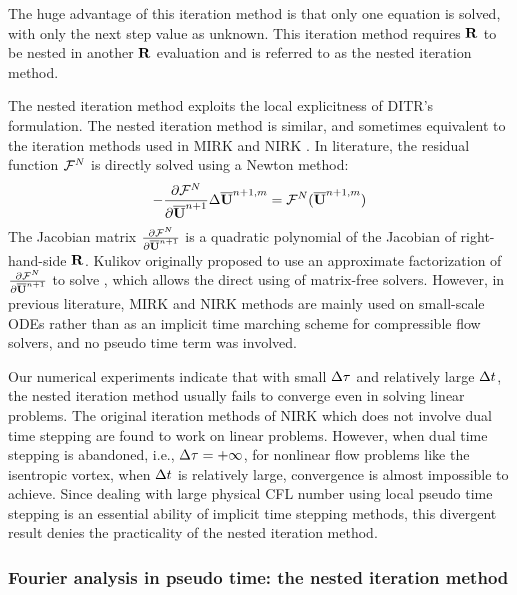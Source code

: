 The huge advantage of this iteration method is that only one equation is solved,
with only the next step value as unknown.
This iteration method requires $\mathbf{R}$ to be nested in another $\mathbf{R}$ evaluation and
is referred to as the nested iteration method.

The nested iteration method exploits the
local explicitness of DITR's formulation.
The nested iteration method is similar, and sometimes equivalent to
the iteration methods used in MIRK \cite{cash1975classMIRKOrig,cash1977clasMIRK1,cash1982monoMIRK2}
and NIRK \cite{kulikov2006familyNIRKOrig,kulikov2009adaptive,kulikov2007asymptotic}.
In literature, the residual function $\mathcal{F}^N$ is directly
solved using a Newton method:
\begin{equation}
    -\partialderivative{\FF^N}{\uu^{n+1}}
    \inc\uu^{n+1,m} = \FF^N(\uu^{n+1,m})
    \label{eq:abstractNewtonNestedNoTau}
\end{equation}
The Jacobian matrix $\partialderivative{\FF^N}{\uu^{n+1}}$
is a quadratic polynomial of the Jacobian of right-hand-side $\mathbf{R}$.
Kulikov originally proposed to use an approximate factorization \cite{kulikov2006familyNIRKOrig}
of $\partialderivative{\FF^N}{\uu^{n+1}}$ to solve ,
which allows the direct using of matrix-free solvers.
However, in previous literature, MIRK and NIRK methods are mainly used on small-scale
ODEs rather than as an implicit time marching scheme for compressible flow solvers,
and no pseudo time term was involved.

Our numerical experiments indicate that with small ${\Delta}\tau$
and relatively large ${\Delta} t$,
the nested iteration method 
usually fails to converge even in solving linear problems.
The original iteration methods of NIRK 
which does not involve dual time stepping
are found to work on linear problems.
However,  when dual time stepping is abandoned, i.e., ${\Delta} \tau=+\infty$,
for nonlinear flow problems like the isentropic vortex,
when ${\Delta} t$ is relatively large, convergence is almost impossible
to achieve.
Since dealing with large physical CFL number using local
pseudo time stepping is an essential ability of implicit
time stepping methods,
this divergent result denies the practicality of the
nested iteration method.






\subsubsection{Fourier analysis in pseudo time: the nested iteration method}

